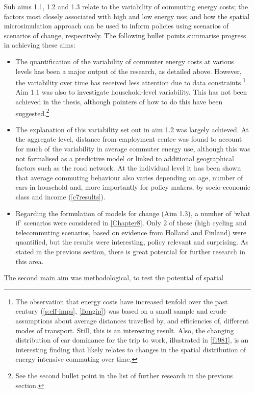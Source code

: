 Sub aims 1.1, 1.2 and 1.3 relate to the variability of commuting energy costs;
the factors most closely associated with high and low energy use; and how the
spatial microsimulation approach can be used to inform policies using scenarios
of scenarios of change, respectively. The following bullet points summarise
progress in achieving these aims:
\begin{itemize}
 \item The quantification of the variability of commuter energy costs at various
levels has been a major output of the research, as detailed above. However, the
variability over time has received less attention due to data
constraints.\footnote{The
observation that energy costs have increased tenfold
over the past century (\cref{s:eff-imps}, \cref{flongip}) was based on a small
sample and crude assumptions about average distances travelled by, and
efficiencies of, different modes of transport. Still, this is an interesting
result. Also, the changing distribution of car dominance for the trip to work,
illustrated in \cref{f1981}, is an interesting finding that likely relates to
changes in the spatial distribution of energy
intensive commuting over time.
}
Aim 1.1 was also to investigate household-level variability. This has not been
achieved in the thesis, although pointers of how to do this have been
suggested.\footnote{See
the second bullet point in the list of further research
in the previous section.
}
\item The explanation of this variability set out in aim 1.2 was largely
achieved. At the aggregate level, distance from employment centre was found to
account for much of the variability in average commuter energy use, although
this was not formalised as a predictive model or linked to additional
geographical factors such as the road network. At the individual level it has
been shown that average commuting behaviour also varies depending on age,
number of cars in household and, more importantly for policy makers, by
socio-economic class and income (\cref{c7results}).
\item Regarding the formulation of models for change (Aim 1.3), a number of
`what if' scenarios were considered in \cref{Chapter8}. Only 2 of
these (high cycling and telecommuting scenarios, based on evidence from Holland
and Finland) were quantified, but the results were interesting, policy relevant
and surprising. As stated in the previous section, there is great potential for
further research in this area.
\end{itemize}
The second main aim was methodological, to test the potential of spatial
